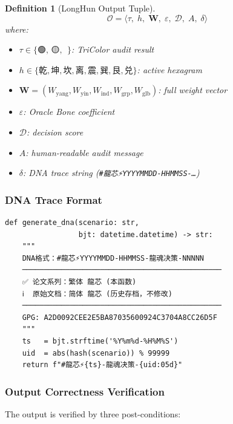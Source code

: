 \documentclass[conference]{IEEEtran}
\newtheorem{definition}{Definition}
\begin{document}
\begin{definition}[LongHun Output Tuple]
\begin{equation}
  \mathcal{O} = \langle
    \tau,\; h,\; \mathbf{W},\;
    \varepsilon,\; \mathcal{D},\;
    A,\; \delta
  \rangle
  \label{eq:output-tuple}
\end{equation}
where:
\begin{itemize}
  \item $\tau \in \{\text{🟢, 🟡, 🔴}\}$:
    TriColor audit result
  \item $h \in \{乾,坤,坎,离,震,巽,艮,兑\}$:
    active hexagram
  \item $\mathbf{W} = (W_{\text{yang}}, W_{\text{yin}},
    W_{\text{ind}}, W_{\text{grp}}, W_{\text{glb}})$:
    full weight vector
  \item $\varepsilon$: Oracle Bone coefficient
  \item $\mathcal{D}$: decision score
  \item $A$: human-readable audit message
  \item $\delta$: DNA trace string
    (\texttt{\#龍芯⚡️YYYYMMDD-HHMMSS-\ldots})
\end{itemize}
\end{definition}

\subsubsection{DNA Trace Format}

\begin{lstlisting}[style=python,
  caption={DNA追溯码生成（繁体龍芯·论文系列标准）},
  label={lst:dna}]
def generate_dna(scenario: str,
                 bjt: datetime.datetime) -> str:
    """
    DNA格式：#龍芯⚡️YYYYMMDD-HHMMSS-龍魂决策-NNNNN
    ──────────────────────────────────────────────
    ✅ 论文系列：繁体 龍芯 (本函数)
    ℹ  原始文档：简体 龍芯 (历史存档，不修改)
    ──────────────────────────────────────────────
    GPG: A2D0092CEE2E5BA87035600924C3704A8CC26D5F
    """
    ts   = bjt.strftime('%Y%m%d-%H%M%S')
    uid  = abs(hash(scenario)) % 99999
    return f"#龍芯⚡️{ts}-龍魂决策-{uid:05d}"
\end{lstlisting}

\subsubsection{Output Correctness Verification}

The output is verified by three post-conditions:
\end{document}
